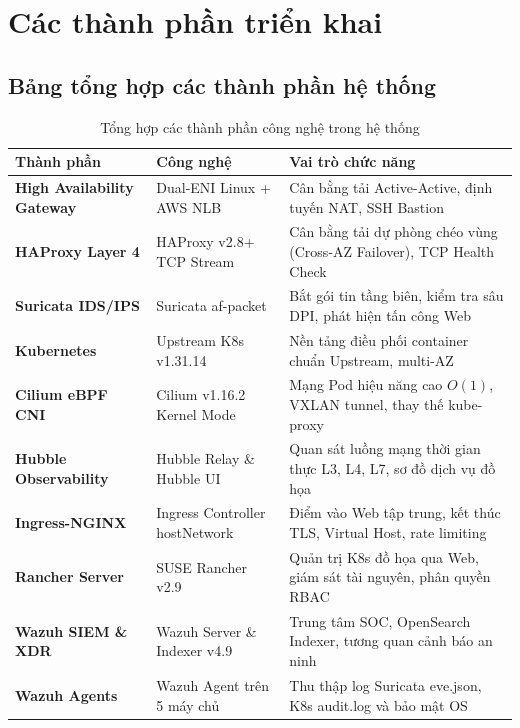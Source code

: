 \chapter{Các thành phần triển khai}
\label{ch:components}

\section{Bảng tổng hợp các thành phần hệ thống}
\begin{table}[H]
    \centering
    \small
    \renewcommand{\arraystretch}{1.25}
    \caption{Tổng hợp các thành phần công nghệ trong hệ thống}
    \label{tab:components_summary}
    \begin{tabularx}{\textwidth}{l l X}
        \toprule
        \textbf{Thành phần} & \textbf{Công nghệ} & \textbf{Vai trò chức năng} \\
        \midrule
        \textbf{High Availability Gateway} & Dual-ENI Linux + AWS NLB & Cân bằng tải Active-Active, định tuyến NAT, SSH Bastion \\
        \textbf{HAProxy Layer 4} & HAProxy v2.8+ TCP Stream & Cân bằng tải dự phòng chéo vùng (Cross-AZ Failover), TCP Health Check \\
        \textbf{Suricata IDS/IPS} & Suricata af-packet & Bắt gói tin tầng biên, kiểm tra sâu DPI, phát hiện tấn công Web \\
        \textbf{Kubernetes} & Upstream K8s v1.31.14 & Nền tảng điều phối container chuẩn Upstream, multi-AZ \\
        \textbf{Cilium eBPF CNI} & Cilium v1.16.2 Kernel Mode & Mạng Pod hiệu năng cao $O(1)$, VXLAN tunnel, thay thế kube-proxy \\
        \textbf{Hubble Observability} & Hubble Relay \& Hubble UI & Quan sát luồng mạng thời gian thực L3, L4, L7, sơ đồ dịch vụ đồ họa \\
        \textbf{Ingress-NGINX} & Ingress Controller hostNetwork & Điểm vào Web tập trung, kết thúc TLS, Virtual Host, rate limiting \\
        \textbf{Rancher Server} & SUSE Rancher v2.9 & Quản trị K8s đồ họa qua Web, giám sát tài nguyên, phân quyền RBAC \\
        \textbf{Wazuh SIEM \& XDR} & Wazuh Server \& Indexer v4.9 & Trung tâm SOC, OpenSearch Indexer, tương quan cảnh báo an ninh \\
        \textbf{Wazuh Agents} & Wazuh Agent trên 5 máy chủ & Thu thập log Suricata eve.json, K8s audit.log và bảo mật OS \\

\end{tabularx}
\end{table}
